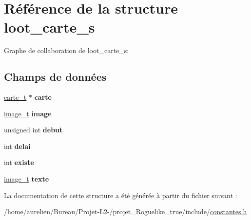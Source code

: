 \hypertarget{structloot__carte__s}{}\section{Référence de la structure loot\+\_\+carte\+\_\+s}
\label{structloot__carte__s}


Graphe de collaboration de loot\+\_\+carte\+\_\+s\+:
\subsection*{Champs de données}
\begin{DoxyCompactItemize}
\item 
\mbox{\label{structloot__carte__s_a1fb53b50b81bd0d9ac6538be18e62345}} 
\hyperlink{structcarte__t}{carte\+\_\+t} $\ast$ {\bfseries carte}
\item 
\mbox{\label{structloot__carte__s_a89ef8065db404d8a63a3ff117c249b04}} 
\hyperlink{structimage__t}{image\+\_\+t} {\bfseries image}
\item 
\mbox{\label{structloot__carte__s_ae6e50808654514e8b45450dcd95cd6d0}} 
unsigned int {\bfseries debut}
\item 
\mbox{\label{structloot__carte__s_a1ea53da41794d914cd9ea5f2ba9898d4}} 
int {\bfseries delai}
\item 
\mbox{\label{structloot__carte__s_a2d057511406d0c264d6583fa541904f2}} 
int {\bfseries existe}
\item 
\mbox{\label{structloot__carte__s_ae4e9d8203e8d0c22f8ac26a1efef66df}} 
\hyperlink{structimage__t}{image\+\_\+t} {\bfseries texte}
\end{DoxyCompactItemize}


La documentation de cette structure a été générée à partir du fichier suivant \+:\begin{DoxyCompactItemize}
\item 
/home/aurelien/\+Bureau/\+Projet-\/\+L2-\//projet\+\_\+\+Roguelike\+\_\+true/include/\hyperlink{constantes_8h}{constantes.\+h}\end{DoxyCompactItemize}
